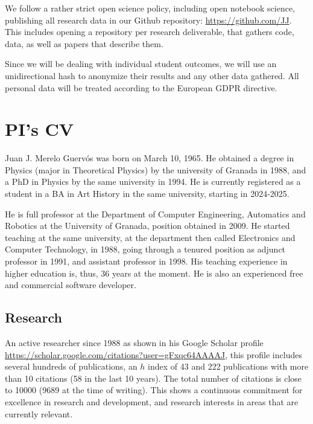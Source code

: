 \documentclass[a4paper,12pt]{article}
\begin{document}
We follow a rather strict open science policy, including open notebook science,
publishing all research data in our Github repository:
\url{https://github.com/JJ}. This includes opening a repository per research
  deliverable, that gathers code, data, as well as papers that describe them.

Since we will be dealing with individual student outcomes, we will use an
unidirectional hash to anonymize their results and any other data gathered. All
personal data will be treated according to the European GDPR directive.

\newpage

\section{PI's CV}

Juan J. Merelo Guervós was born on March 10, 1965. He obtained a degree in Physics (major in Theoretical Physics) by the university of Granada in 1988, and a PhD in Physics by the same university in 1994. He is currently registered as a student in a BA in Art History in the same university, starting in 2024-2025.

He is full professor at the Department of Computer Engineering, Automatics and
Robotics at the University of Granada, position obtained in 2009. He started
teaching at the same university, at the department then called Electronics and
Computer Technology, in 1988, going through a tenured position as adjunct
professor in 1991, and assistant professor in 1998. His teaching experience in
higher education is, thus, 36 years at the moment. He is also an experienced
free and commercial software developer.


\subsection{Research}

An active researcher since 1988 as shown in his Google Scholar profile \url{https://scholar.google.com/citations?user=gFxqc64AAAAJ}, this profile includes several hundreds of publications, an $h$ index of 43 and 222 publications with more than 10 citations (58 in the last 10 years). The total number of citations is close to 10000 (9689 at the time of writing). This shows a continuous commitment for excellence in research and development, and research interests in areas that are currently relevant.
\end{document}
